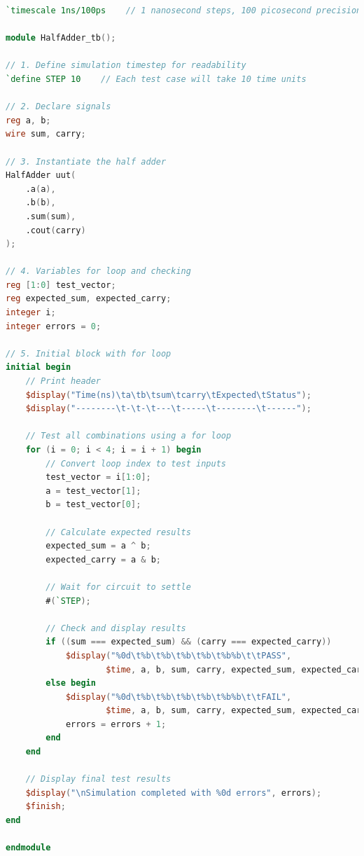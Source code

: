 \documentclass[12pt]{labmanual}
\begin{document}
\begin{lstlisting}[language=verilog]
`timescale 1ns/100ps    // 1 nanosecond steps, 100 picosecond precision

module HalfAdder_tb();

// 1. Define simulation timestep for readability
`define STEP 10    // Each test case will take 10 time units

// 2. Declare signals
reg a, b;           
wire sum, carry;    

// 3. Instantiate the half adder
HalfAdder uut(
    .a(a),
    .b(b),
    .sum(sum),
    .cout(carry)
);

// 4. Variables for loop and checking
reg [1:0] test_vector;
reg expected_sum, expected_carry;
integer i;
integer errors = 0;

// 5. Initial block with for loop
initial begin
    // Print header
    $display("Time(ns)\ta\tb\tsum\tcarry\tExpected\tStatus");
    $display("--------\t-\t-\t---\t-----\t--------\t------");
    
    // Test all combinations using a for loop
    for (i = 0; i < 4; i = i + 1) begin
        // Convert loop index to test inputs
        test_vector = i[1:0];
        a = test_vector[1];
        b = test_vector[0];
        
        // Calculate expected results
        expected_sum = a ^ b;
        expected_carry = a & b;
        
        // Wait for circuit to settle
        #(`STEP);
        
        // Check and display results
        if ((sum === expected_sum) && (carry === expected_carry))
            $display("%0d\t%b\t%b\t%b\t%b\t%b%b\t\tPASS", 
                    $time, a, b, sum, carry, expected_sum, expected_carry);
        else begin
            $display("%0d\t%b\t%b\t%b\t%b\t%b%b\t\tFAIL", 
                    $time, a, b, sum, carry, expected_sum, expected_carry);
            errors = errors + 1;
        end
    end
    
    // Display final test results
    $display("\nSimulation completed with %0d errors", errors);
    $finish;
end

endmodule
\end{lstlisting}
\end{document}
